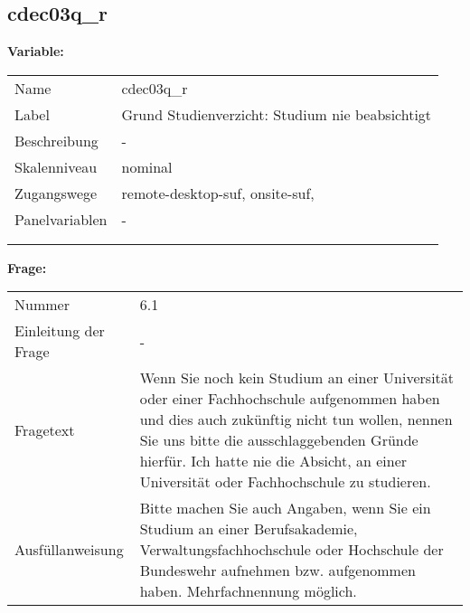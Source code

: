 	
	
	\subsection{cdec03q\_r}
	\label{subSection:cdec03q_r}

	\noindent\textbf{Variable:}\\
		\begin{tabular}{lL{11.3cm}}
			\label{tableVariable:cdec03q_r}
			Name & cdec03q\_r \\
			Label & Grund Studienverzicht: Studium nie beabsichtigt \\
			Beschreibung & - \\
			Skalenniveau & nominal \\
			Zugangswege &
				remote-desktop-suf,
				onsite-suf,
 \\
			Panelvariablen & -
			 \\
			 \\
 \\
		\end{tabular}

		\vspace*{1 cm}
		\noindent\textbf{Frage:}\\
		\begin{tabular}{lL{11.3cm}}
			\label{tableQuestion:cdec03q_r}
			Nummer & 6.1 \\
			Einleitung der Frage & - \\
			Fragetext & Wenn Sie noch kein Studium an einer Universität oder einer Fachhochschule aufgenommen haben und dies auch zukünftig nicht tun wollen, nennen Sie uns bitte die ausschlaggebenden Gründe hierfür.
Ich hatte nie die Absicht, an einer Universität oder Fachhochschule zu studieren. \\
			Ausfüllanweisung & Bitte machen Sie auch Angaben, wenn Sie ein Studium an einer Berufsakademie, Verwaltungsfachhochschule oder Hochschule der Bundeswehr aufnehmen bzw. aufgenommen haben. Mehrfachnennung möglich. \\
		\end{tabular}





